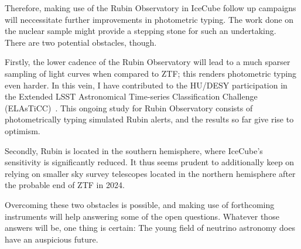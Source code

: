 Therefore, making use of the Rubin Observatory in IceCube follow up campaigns will neccessitate further improvements in photometric typing. The work done on the nuclear sample might provide a stepping stone for such an undertaking. There are two potential obstacles, though.

Firstly, the lower cadence of the Rubin Observatory will lead to a much sparser sampling of light curves when compared to ZTF; this renders photometric typing even harder. In this vein, I have contributed to the HU/DESY participation in the Extended LSST Astronomical Time-series Classification Challenge (ELAsTiCC)~. This ongoing study for Rubin Observatory consists of photometrically typing simulated Rubin alerts, and the results so far give rise to optimism.

Secondly, Rubin is located in the southern hemisphere, where IceCube's sensitivity is significantly reduced. It thus seems prudent to additionally keep on relying on smaller sky survey telescopes located in the northern hemisphere after the probable end of ZTF in 2024.

Overcoming these two obstacles is possible, and making use of forthcoming instruments will help answering some of the open questions. Whatever those answers will be, one thing is certain: The young field of neutrino astronomy does have an auspicious future.